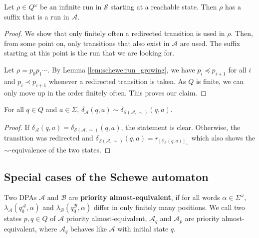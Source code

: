 \begin{lem}
\label{lem:schewe:run_suffix}
	Let $\rho \in Q^\omega$ be an infinite run in $\mathcal{S}$ starting at a reachable state. Then $\rho$ has a suffix that is a run in $\mathcal{A}$.
\end{lem} 

\begin{proof}
	We show that only finitely often a redirected transition is used in $\rho$. Then, from some point on, only transitions that also exist in $\mathcal{A}$ are used. The suffix starting at this point is the run that we are looking for.
	
	Let $\rho = p_0 p_1 \cdots$. By Lemma \ref{lem:schewe:run_growing}, we have $p_i \preceq p_{i+1}$ for all $i$ and $p_i \prec p_{i+1}$ whenever a redirected transition is taken. As $Q$ is finite, we can only move up in the order finitely often. This proves our claim.
\end{proof}


\begin{lem}
\label{lem:schewe:sim_a_s}
	For all $q \in Q$ and $a \in \Sigma$, $\delta_\mathcal{A}(q, a) \sim \delta_{\mathcal{S}(\mathcal{A}, \sim)}(q, a)$.
\end{lem}

\begin{proof}
	If $\delta_\mathcal{A}(q, a) = \delta_{\mathcal{S}(\mathcal{A}, \sim)}(q, a)$, the statement is clear. Otherwise, the transition was redirected and $\delta_{\mathcal{S}(\mathcal{A}, \sim)}(q, a) = r_{[\delta_\mathcal{A}(q, a)]_\sim}$ which also shows the $\sim$-equivalence of the two states.
\end{proof}


\vspace{1cm}

\subsection{Special cases of the Schewe automaton}
\begin{defn}
	Two DPAs $\mathcal{A}$ and $\mathcal{B}$ are \textbf{priority almost-equivalent}, if for all words $\alpha \in \Sigma^\omega$, $\lambda_\mathcal{A}(q_0^\mathcal{A}, \alpha)$ and $\lambda_\mathcal{B}(q_0^\mathcal{B}, \alpha)$ differ in only finitely many positions.
	We call two states $p, q \in Q$ of $\mathcal{A}$ priority almost-equivalent, $\mathcal{A}_q$ and $\mathcal{A}_p$ are priority almost-equivalent, where $\mathcal{A}_q$ behaves like $\mathcal{A}$ with initial state $q$.
\end{defn}


